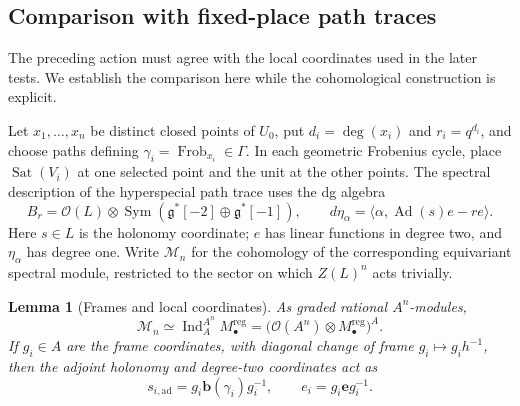 \documentclass[11pt]{article}
\numberwithin{equation}{section}
\newtheorem{lemma}[theorem]{Lemma}
\theoremstyle{definition}
\theoremstyle{remark}
\newcommand{\g}{\mathfrak g}
\newcommand{\cO}{\mathcal O}
\newcommand{\Frob}{\operatorname{Frob}}
\newcommand{\Ad}{\operatorname{Ad}}
\newcommand{\Ind}{\operatorname{Ind}}
\newcommand{\Sym}{\operatorname{Sym}}
\newcommand{\Sat}{\operatorname{Sat}}
\begin{document}
\subsection{Comparison with fixed-place path traces}

The preceding action must agree with the local coordinates used in
the later tests.  We establish the comparison here while the
cohomological construction is explicit.

Let $x_1,\ldots,x_n$ be distinct closed points of $U_0$, put
$d_i=\deg(x_i)$ and $r_i=q^{d_i}$, and choose paths defining
$\gamma_i=\Frob_{x_i}\in\Gamma$.  In each geometric Frobenius
cycle, place $\Sat(V_i)$ at one selected point and the unit at the
other points.  The spectral description of the hyperspecial path
trace \cite[Section~2, Proposition ``Spectral form of a Frobenius
trace'']{Parent} uses the dg algebra
\[
 B_r=\cO(L)\otimes\Sym(\g^*[-2]\oplus\g^*[-1]),\qquad
 d\eta_\alpha=\langle\alpha,\Ad(s)e-re\rangle.
\]
Here $s\in L$ is the holonomy coordinate; $e$ has linear functions
in degree two, and $\eta_\alpha$ has degree one.  Write
$\mathcal M_n$ for the cohomology of the corresponding equivariant
spectral module, restricted to the sector on which $Z(L)^n$ acts
trivially.

\begin{lemma}[Frames and local coordinates]\label{lem:glob-frames}
As graded rational $A^n$-modules,
\begin{equation}\label{eq:framed-module}
 \mathcal M_n\simeq\Ind_A^{A^n}M_\bullet^{\mathrm{reg}}
        =\bigl(\cO(A^n)\otimes M_\bullet^{\mathrm{reg}}\bigr)^A.
\end{equation}
If $g_i\in A$ are the frame coordinates, with diagonal change of
frame $g_i\mapsto g_i h^{-1}$, then the adjoint holonomy and
degree-two coordinates act as
\begin{equation}\label{eq:framed-action}
 s_{i,\mathrm{ad}}=g_i\mathbf b(\gamma_i)g_i^{-1},
       \qquad e_i=g_i\mathbf e g_i^{-1}.
\end{equation}
\end{lemma}
\end{document}
